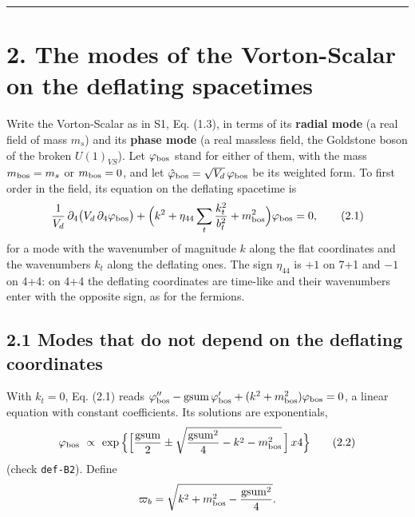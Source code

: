 \documentclass[
  10pt,
]{article}
\begin{document}
\begin{center}\rule{0.5\linewidth}{0.5pt}\end{center}

\hypertarget{the-modes-of-the-vorton-scalar-on-the-deflating-spacetimes}{%
\section{2. The modes of the Vorton-Scalar on the deflating
spacetimes}\label{the-modes-of-the-vorton-scalar-on-the-deflating-spacetimes}}

Write the Vorton-Scalar as in S1, Eq. (1.3), in terms of its
\textbf{radial mode} (a real field of mass \(m_s\)) and its
\textbf{phase mode} (a real massless field, the Goldstone boson of the
broken \(U(1)_{VS}\)). Let \(\varphi_{\rm bos}\) stand for either of
them, with the mass \(m_{\rm bos}=m_s\) or \(m_{\rm bos}=0\), and let
\(\hat\varphi_{\rm bos}=\sqrt{V_d}\,\varphi_{\rm bos}\) be its weighted
form. To first order in the field, its equation on the deflating
spacetime is
\[\frac{1}{V_d}\,\partial_4\big(V_d\,\partial_4\varphi_{\rm bos}\big)
+\Big(k^2+\eta_{44}\sum_t\frac{k_t^2}{b_t^2}+m_{\rm bos}^2\Big)\varphi_{\rm bos}=0,\tag{2.1}\]
for a mode with the wavenumber of magnitude \(k\) along the flat
coordinates and the wavenumbers \(k_t\) along the deflating ones. The
sign \(\eta_{44}\) is \(+1\) on 7+1 and \(-1\) on 4+4: on 4+4 the
deflating coordinates are time-like and their wavenumbers enter with the
opposite sign, as for the fermions.

\hypertarget{modes-that-do-not-depend-on-the-deflating-coordinates}{%
\subsection{2.1 Modes that do not depend on the deflating
coordinates}\label{modes-that-do-not-depend-on-the-deflating-coordinates}}

With \(k_t=0\), Eq. (2.1) reads
\(\varphi_{\rm bos}''-\mathrm{gsum}\,\varphi_{\rm bos}'+(k^2+m_{\rm bos}^2)\varphi_{\rm bos}=0\),
a linear equation with constant coefficients. Its solutions are
exponentials,
\[\varphi_{\rm bos}\ \propto\ \exp\Big\{\Big[\frac{\mathrm{gsum}}2\pm\sqrt{\frac{\mathrm{gsum}^2}{4}-k^2-m_{\rm bos}^2}\,\Big]\,x4\Big\}\tag{2.2}\]
(check \texttt{def-B2}). Define
\[\varpi_b=\sqrt{k^2+m_{\rm bos}^2-\frac{\mathrm{gsum}^2}{4}} .\]
\end{document}
